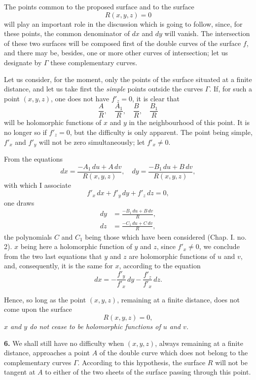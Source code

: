 \documentclass{article}
\begin{document}
The points common to the proposed surface and to the surface
\[
R(x, y, z) = 0
\]
will play an important role in the discussion which is going to follow, since, for these points, the common denominator of $dx$ and $dy$ will vanish. The intersection of these two surfaces will be composed first of the double curves of the surface $f$, and there may be, besides, one or more other curves of intersection; let us designate by $\Gamma$ these complementary curves.

Let us consider, for the moment, only the points of the surface situated at a finite distance, and let us take first the \emph{simple} points outside the curves $\Gamma$. If, for such a point $(x, y, z)$, one does not have $f'_{z} = 0$, it is clear that
\[
\frac{A}{R}, \quad \frac{A_{1}}{R}, \quad \frac{B}{R}, \quad \frac{B_{1}}{R}
\]
will be holomorphic functions of $x$ and $y$ in the neighbourhood of this point. It is no longer so if $f'_{z} = 0$, but the difficulty is only apparent. The point being simple, $f'_{x}$ and $f'_{y}$ will not be zero simultaneously; let $f'_{x} \neq 0$.

From the equations
\[
dx = \frac{-A_{1}\,du + A\,dv}{R(x, y, z)}, \quad dy = \frac{-B_{1}\,du + B\,dv}{R(x, y, z)},
\]
with which I associate
\[
f'_{x}\,dx + f'_{y}\,dy + f'_{z}\,dz = 0,
\]
one draws
\[
\begin{aligned}
dy &= \frac{-B_{1}\,du + B\,dv}{R}, \\
dz &= \frac{-C_{1}\,du + C\,dv}{R},
\end{aligned}
\]
the polynomials $C$ and $C_{1}$ being those which have been considered (Chap. I. no. 2).
$x$ being here a holomorphic function of $y$ and $z$, since $f'_{x} \neq 0$, we conclude from the two last equations that $y$ and $z$ are holomorphic functions of $u$ and $v$, and, consequently, it is the same for $x$, according to the equation
\[
dx = -\frac{f'_{y}}{f'_{x}}\,dy - \frac{f'_{z}}{f'_{x}}\,dz.
\]

Hence, so long as the point $(x, y, z)$, remaining at a finite distance, does not come upon the surface
\[
R(x, y, z) = 0,
\]
\emph{$x$ and $y$ do not cease to be holomorphic functions of $u$ and $v$.}

\textbf{6.} We shall still have no difficulty when $(x, y, z)$, always remaining at a finite distance, approaches a point $A$ of the double curve which does not belong to the complementary curves $\Gamma$. According to this hypothesis, the surface $R$ will not be tangent at $A$ to either of the two sheets of the surface passing through this point.
\end{document}
